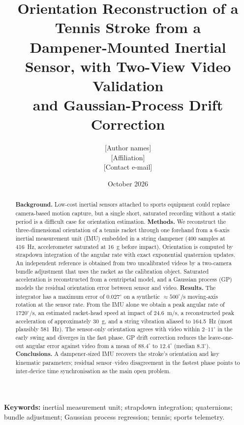 \documentclass[11pt,a4paper]{article}
\title{\textbf{Orientation Reconstruction of a Tennis Stroke from a\\
Dampener-Mounted Inertial Sensor, with Two-View Video Validation\\
and Gaussian-Process Drift Correction}}
\author{[Author names]\\[0.3em]
\small [Affiliation]\\
\small [Contact e-mail]}
\date{October 2026}
\newcommand{\dg}{^{\circ}}
\begin{document}
\maketitle

\begin{abstract}
\noindent\textbf{Background.} Low-cost inertial sensors attached to sports equipment could replace
camera-based motion capture, but a single short, saturated recording without a static period is a
difficult case for orientation estimation.
\textbf{Methods.} We reconstruct the three-dimensional orientation of a tennis racket through one
forehand from a 6-axis inertial measurement unit (IMU) embedded in a string dampener (400 samples
at \SI{416}{Hz}, accelerometer saturated at \SI{16}{g} before impact). Orientation is computed by
strapdown integration of the angular rate with exact exponential quaternion updates. An independent
reference is obtained from two uncalibrated videos by a two-camera bundle adjustment that uses the
racket as the calibration object. Saturated acceleration is reconstructed from a centripetal model,
and a Gaussian process (GP) models the residual orientation error between sensor and video.
\textbf{Results.} The integrator has a maximum error of $0.027\dg$ on a synthetic
$\approx500\dg/\mathrm{s}$ moving-axis rotation at the sensor rate. From the IMU alone we obtain a
peak angular rate of $1720\dg/\mathrm{s}$, an estimated racket-head speed at impact of
\SI{24.6}{m/s}, a reconstructed peak acceleration of approximately \SI{30}{g}, and a string
vibration aliased to \SI{164.5}{Hz} (most plausibly \SI{581}{Hz}). The sensor-only orientation
agrees with video within $2$--$11\dg$ in the early swing and diverges in the fast phase. GP drift
correction reduces the leave-one-out angular error against video from a mean of $88.4\dg$ to
$12.4\dg$ (median $8.3\dg$).
\textbf{Conclusions.} A dampener-sized IMU recovers the stroke's orientation and key kinematic
parameters; residual sensor--video disagreement in the fastest phase points to inter-device time
synchronisation as the main open problem.
\end{abstract}

\noindent\textbf{Keywords:} inertial measurement unit; strapdown integration; quaternions; bundle
adjustment; Gaussian process regression; tennis; sports telemetry.

\end{document}
